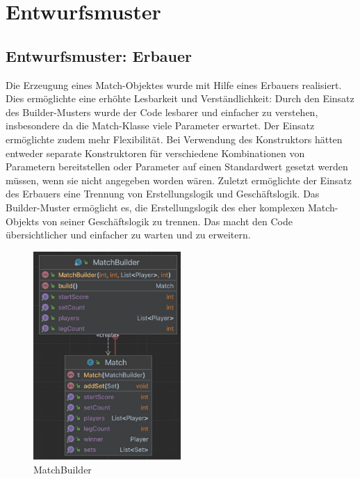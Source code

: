 \chapter{Entwurfsmuster}
\section{Entwurfsmuster: Erbauer}
Die Erzeugung eines Match-Objektes wurde mit Hilfe eines Erbauers realisiert.
Dies ermöglichte eine erhöhte Lesbarkeit und Verständlichkeit: Durch den Einsatz des Builder-Musters wurde der Code lesbarer und einfacher zu verstehen, insbesondere da die Match-Klasse viele Parameter erwartet.
Der Einsatz ermöglichte zudem mehr Flexibilität. Bei Verwendung des Konstruktors hätten entweder separate Konstruktoren für verschiedene Kombinationen von Parametern bereitstellen oder Parameter auf einen Standardwert gesetzt werden müssen, wenn sie nicht angegeben worden wären.
Zuletzt ermöglichte der Einsatz des Erbauers eine Trennung von Erstellungslogik und Geschäftslogik. Das Builder-Muster ermöglicht es, die Erstellungslogik des eher komplexen Match-Objekts von seiner Geschäftslogik zu trennen. Das macht den Code übersichtlicher und einfacher zu warten und zu erweitern.\newpage
\begin{figure}[ht]
    \centering
    \includegraphics[width=0.5\textwidth]{Bilder/MatchBuilder.png}
    \caption{MatchBuilder}
    \label{fig:matchbuilder}
\end{figure}


